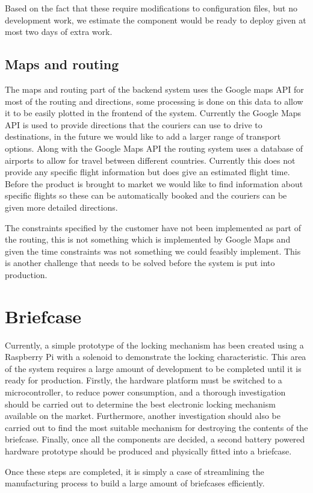 Based on the fact that these require modifications to configuration files, but no development work, we estimate the component would be ready to deploy given at most two days of extra work.

\subsection{Maps and routing}

The maps and routing part of the backend system uses the Google maps API \cite{MapsAPI} for most of the routing and directions, some processing is done on this data to allow it to be easily plotted in the frontend of the system. Currently the Google Maps API is used to provide directions that the couriers can use to drive to destinations, in the future we would like to add a larger range of transport options. Along with the Google Maps API the routing system uses a database of airports \cite{AirpotFile} to allow for travel between different countries. Currently this does not provide any specific flight information but does give an estimated flight time. Before the product is brought to market we would like to find information about specific flights so these can be automatically booked and the couriers can be given more detailed directions.

The constraints specified by the customer have not been implemented as part of the routing, this is not something which is implemented by Google Maps and given the time constraints was not something we could feasibly implement. This is another challenge that needs to be solved before the system is put into production.

\section{Briefcase}
Currently, a simple prototype of the locking mechanism has been created using a Raspberry Pi \cite{raspberryPi} with a solenoid to demonstrate the locking characteristic. This area of the system requires a large amount of development to be completed until it is ready for production. Firstly, the hardware platform must be switched to a microcontroller, to reduce power consumption, and a thorough investigation should be carried out to determine the best electronic locking mechanism available on the market. Furthermore, another investigation should also be carried out to find the most suitable mechanism for destroying the contents of the briefcase. Finally, once all the components are decided, a second battery powered hardware prototype should be produced and physically fitted into a briefcase.

Once these steps are completed, it is simply a case of streamlining the manufacturing process to build a large amount of briefcases efficiently.